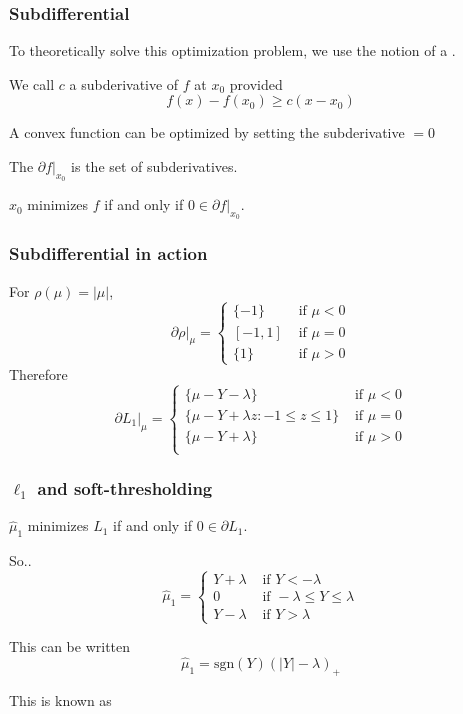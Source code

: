 \documentclass[12pt]{beamer}
\begin{document}
\begin{frame}
\frametitle{Subdifferential}
To theoretically solve this optimization problem, we use the notion of a .

\vsp
We call $c$ a subderivative of $f$ at $x_0$ provided
\[
f(x) - f(x_0) \geq  c(x - x_0)
\]

A convex function can be optimized by setting the subderivative $= 0$

\vsp
The  $\partial f|_{x_0}$ is the set of subderivatives. 
\vsp

$x_0$ minimizes $f$ if and only if $0 \in \partial f|_{x_0}$.

\end{frame}

\begin{frame}
\frametitle{Subdifferential in action}
For $\rho(\mu) = |\mu|$,
\[
\partial \rho|_{\mu}
=
\begin{cases}
\{ -1\} & \textrm{ if } \mu < 0 \\
[-1,1] & \textrm{ if } \mu = 0 \\
\{ 1\} & \textrm{ if } \mu > 0 
\end{cases}
\]
Therefore
\[
\partial L_1|_{\mu}
=
\begin{cases}
\{ \mu - Y - \lambda\} & \textrm{ if } \mu < 0 \\
\{\mu - Y + \lambda z : -1 \leq z \leq 1 \} & \textrm{ if } \mu = 0 \\
\{ \mu - Y + \lambda\} & \textrm{ if } \mu > 0 \\
\end{cases}
\]

\end{frame}

\begin{frame}
\frametitle{$\ell_1$ and soft-thresholding}

$\hat\mu_1$ minimizes $L_1$ if and only if $0 \in \partial L_1$.
\vsp

So..
\[
\hat{\mu}_1 
=
\begin{cases}
Y + \lambda & \textrm{ if } Y < -\lambda \\
0 & \textrm{ if } -\lambda \leq Y \leq \lambda \\
Y - \lambda & \textrm{ if } Y > \lambda 
\end{cases}
\]

This can be written
\[
\hat{\mu}_1 = \textrm{sgn}(Y)(|Y| - \lambda)_+
\]

This is known as 
\end{frame}
\end{document}
